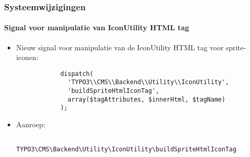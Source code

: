 \begin{frame}[fragile]
	\frametitle{Systeemwijzigingen}
	\framesubtitle{Signal voor manipulatie van IconUtility HTML tag}

	\lstset{
		basicstyle=\tiny\ttfamily
	}

	\begin{itemize}

		\item Nieuw signal voor manipulatie van de IconUtility HTML tag voor sprite-iconen:

		\begin{lstlisting}
			dispatch(
			  'TYPO3\\CMS\\Backend\\Utility\\IconUtility',
			  'buildSpriteHtmlIconTag',
			  array($tagAttributes, $innerHtml, $tagName)
			);
		\end{lstlisting}

		\item Aanroep:

		\begin{lstlisting}
			TYPO3\CMS\Backend\Utility\IconUtility\buildSpriteHtmlIconTag
		\end{lstlisting}

	\end{itemize}

\end{frame}


